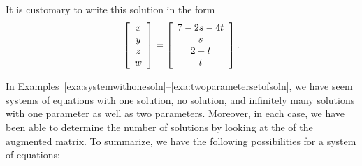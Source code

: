 \begin{solution}
\begin{equation*}
  \end{equation*}
  It is customary to write this solution in the form
  \begin{equation}\label{twoparameters2}
    \left[
    \begin{array}{c}
      x \\
      y \\
      z \\
      w
    \end{array}
    \right] =\left[
    \begin{array}{c}
      7-2s-4t \\
      s \\
      2-t \\
      t
    \end{array}
    \right].
  \end{equation}
\end{solution}

In
Examples~\ref{exa:systemwithonesoln}--\ref{exa:twoparametersetofsoln},
we have seem systems of equations with one solution, no solution, and
infinitely many solutions with one parameter as well as two
parameters. Moreover, in each case, we have been able to determine the
number of solutions by looking at the {\ef} of the augmented matrix.
To summarize, we have the following possibilities for a system of equations:

